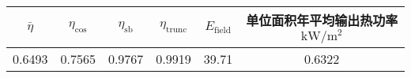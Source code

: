 \begin{tabular}{|cccccc|}
\hline
\(\bar \eta\) & \(\eta _{\cos}\) & \(\eta _{\mathrm{s b}}\) & \(\eta _{\mathrm{trunc}}\) & \(E_{\mathrm{field}}\) &单位面积年平均输出热功率 \(\mathrm{kW}/\mathrm{m}^{2}\)\\
\hline
0.6493 & 0.7565 & 0.9767 & 0.9919 & 39.71 & 0.6322\\
\hline
\end{tabular}
